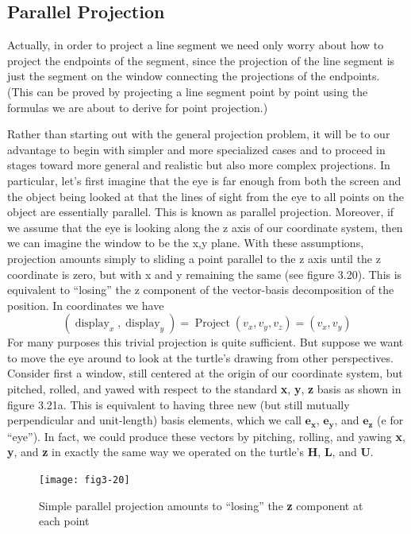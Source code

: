 \documentclass{book}
\begin{document}
\subsection{Parallel Projection}

Actually, in order to project a line segment we need only worry about
how to project the endpoints of the segment, since the projection of
the line segment is just the segment on the window connecting the
projections of the endpoints. (This can be proved by projecting a line
segment point by point using the formulas we are about to derive for
point projection.)

Rather than starting out with the general projection problem, it will
be to our advantage to begin with simpler and more specialized cases
and to proceed in stages toward more general and realistic but also more
complex projections. In particular, let's first imagine that the eye is far
enough from both the screen and the object being looked at that the
lines of sight from the eye to all points on the object are essentially
parallel. This is known as parallel projection. Moreover, if we assume
that the eye is looking along the z axis of our coordinate system, then we
can imagine the window to be the x,y plane. With these assumptions,
projection amounts simply to sliding a point parallel to the z axis until
the z coordinate is zero, but with x and y remaining the same (see figure
3.20). This is equivalent to ``losing'' the z component of the vector-basis
decomposition of the position. In coordinates we have
$$(\operatorname{display}_x, \operatorname{display}_y) = \operatorname{Project}(v_x, v_y, v_z) = (v_x, v_y)$$
For many purposes this trivial projection is quite sufficient. But
suppose we want to move the eye around to look at the turtle's drawing
from other perspectives. Consider first a window, still centered at the
origin of our coordinate system, but pitched, rolled, and yawed with
respect to the standard \textbf{x}, \textbf{y}, \textbf{z} basis as shown in figure 3.21a. This is
equivalent to having three new (but still mutually perpendicular and
unit-length) basis elements, which we call $\mathbf{e_x}$, $\mathbf{e_y}$, and $\mathbf{e_z}$ (e for ``eye'').
In fact, we could produce these vectors by pitching, rolling, and yawing
\textbf{x}, \textbf{y}, and \textbf{z} in exactly the same way we operated on the turtle's \textbf{H}, \textbf{L},
and \textbf{U}.

\begin{figure}
\begin{center}
\texttt{[image: fig3-20]}
\caption{Simple parallel projection amounts to ``losing'' the \textbf{z} component at each point}
\end{center}
\end{figure}
\end{document}
